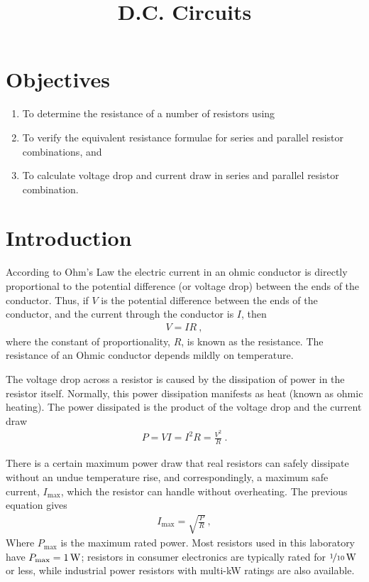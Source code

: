 \documentclass[12pt]{article}
\title{D.C. Circuits}
\author{}
\date{}
\begin{document}
\maketitle

\section{Objectives}
\label{sec:objectives}

\begin{enumerate}
\item To determine the resistance of a number of resistors using 
\item To verify the equivalent resistance formulae for series and
  parallel resistor combinations, and
\item To calculate voltage drop and current draw in series and
  parallel resistor combination.
\end{enumerate}

\section{Introduction}
\label{sec:introduction}

According to Ohm's Law the electric current in an ohmic conductor is
directly proportional to the potential difference (or voltage drop)
between the ends of the conductor.  Thus, if $V$ is the potential
difference between the ends of the conductor, and the current through
the conductor is $I$, then
\begin{gather*}
  V = IR\ ,
\end{gather*}
where the constant of proportionality, $R$, is known as the
resistance.  The resistance of an Ohmic conductor depends mildly on
temperature.

The voltage drop across a resistor is caused by the dissipation of
power in the resistor itself.  Normally, this power dissipation
manifests as heat (known as ohmic heating).  The power dissipated is
the product of the voltage drop and the current draw
\begin{gather*}
  P = VI = I^2 R = \frac{V^2}{R}\ .
\end{gather*}

There is a certain maximum power draw that real resistors can safely
dissipate without an undue temperature rise, and correspondingly, a
maximum safe current, $I_\mathrm{max}$, which the resistor can handle
without overheating.  The previous equation gives
\begin{gather*}
  I_\mathrm{max} = \sqrt{\frac{P}{R}}\ ,
\end{gather*}
Where $P_\mathrm{max}$ is the maximum rated power.  Most resistors
used in this laboratory have $P_\mathrm{max} = \unit[1]{W}$; resistors
in consumer electronics are typically rated for
$\unit[\nicefrac{1}{10}]{W}$ or less, while industrial power resistors
with multi-\unit{kW} ratings are also available.
\end{document}
